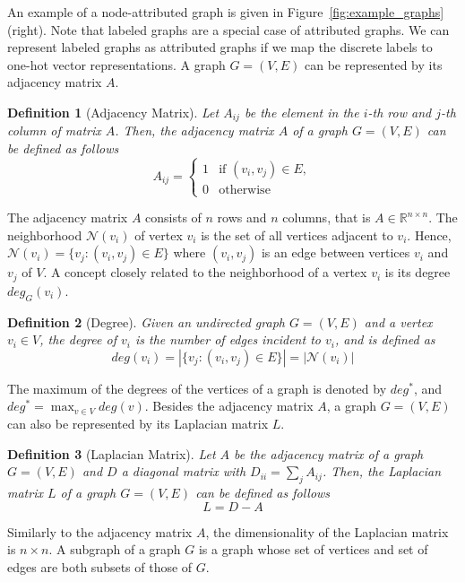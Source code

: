\documentclass[twoside,11pt]{article}
\newtheorem{definition}{Definition}
\begin{document}
An example of a node-attributed graph is given in Figure~\ref{fig:example_graphs} (right).
Note that labeled graphs are a special case of attributed graphs.
We can represent labeled graphs as attributed graphs if we map the discrete labels to one-hot vector representations.
A graph $G=(V,E)$ can be represented by its adjacency matrix $A$.
\begin{definition}[Adjacency Matrix]
    Let $A_{ij}$ be the element in the $i$-th row and $j$-th column of matrix $A$.
    Then, the adjacency matrix $A$ of a graph $G=(V,E)$ can be defined as follows
    \[A_{ij} = \left\{
      \begin{array}{lr}
        1 & \text{if }(v_i,v_j) \in E,\\
        0 & \text{otherwise}
      \end{array}
    \right.
    \]
\end{definition}
The adjacency matrix $A$ consists of $n$ rows and $n$ columns, that is $A \in \mathbb{R}^{n \times n}$.
The neighborhood $\mathcal{N}(v_i)$ of vertex $v_i$ is the set of all vertices adjacent to $v_i$.
Hence, $\mathcal{N}(v_i) = \{v_j : (v_i,v_j) \in E\}$ where $(v_i, v_j)$ is an edge between vertices $v_i$ and $v_j$ of $V$.
A concept closely related to the neighborhood of a vertex $v_i$ is its degree $deg_G(v_i)$.
\begin{definition}[Degree]
    Given an undirected graph $G=(V,E)$ and a vertex $v_i \in V$, the degree of $v_i$ is the number of edges incident to $v_i$, and is defined as
    \begin{equation}
        deg(v_i) = | \{v_j : (v_i,v_j) \in E \} | = |\mathcal{N}(v_i)|
    \end{equation}
\end{definition}
The maximum of the degrees of the vertices of a graph is denoted by $deg^*$, and $deg^* = \max_{v \in V} deg(v)$.
Besides the adjacency matrix $A$, a graph $G=(V,E)$ can also be represented by its Laplacian matrix $L$.
\begin{definition}[Laplacian Matrix]
    Let $A$ be the adjacency matrix of a graph $G=(V,E)$ and $D$ a diagonal matrix with $D_{ii} = \sum_j A_{ij}$.
    Then, the Laplacian matrix $L$ of a graph $G=(V,E)$ can be defined as follows
    \begin{equation}
      L = D - A
    \end{equation}
\end{definition}
Similarly to the adjacency matrix $A$, the dimensionality of the Laplacian matrix is $n \times n$.
A subgraph of a graph $G$ is a graph whose set of vertices and set of edges are both subsets of those of $G$.
\end{document}
